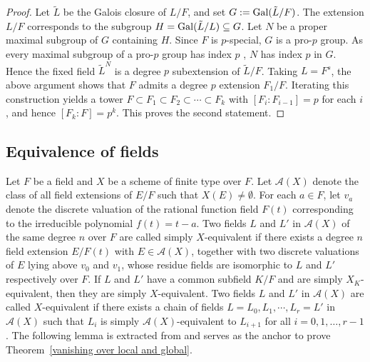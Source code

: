 \documentclass[10pt]{amsart}
\theoremstyle{plain}
\theoremstyle{definition}
\newcommand{\Gal}{{\rm Gal}}
\begin{document}
\begin{proof}
Let \(\tilde{L}\) be the Galois closure of \(L/F\), and set
\(G:=\Gal(\tilde{L}/F)\). The extension \(L/F\) corresponds to the subgroup \(H=\Gal(\tilde{L}/L)\subseteq G\). Let \(N\) be a proper maximal subgroup of \(G\) containing \(H\). Since \(F\) is \(p\)-special, \(G\) is a pro-\(p\) group. As every maximal subgroup of a pro-\(p\) group has index \(p\) \cite[Lemma 22.7.4]{fried2008field}, \(N\) has index \(p\) in \(G\). Hence the fixed field \(\tilde{L}^{N}\) is a degree \(p\) subextension of \(\tilde{L}/F\). Taking \(L=F^s\), the above argument shows that \(F\) admits a degree \(p\) extension \(F_1/F\). Iterating this construction yields a tower \(F \subset F_1 \subset F_2 \subset \cdots \subset F_k\) with \([F_i:F_{i-1}]=p\) for each \(i\), and hence \([F_k:F]=p^k\). This proves the second statement.
\end{proof}


\subsection{Equivalence of fields \cite[Section 6]{MC}}
Let \(F\) be a field and \(X\) be a scheme of finite type over \(F\). Let \(\mathcal{A}(X)\) denote the class of all field extensions of \(E/F\) such that \(X(E)\neq\emptyset\). For each \(a \in F\), let \(v_a\) denote the discrete valuation of the rational function field \(F(t)\) corresponding to the irreducible polynomial \(f(t)=t-a\). Two fields \(L\) and \(L'\) in \(\mathcal{A}(X)\) of the same degree \(n\) over \(F\) are called simply \(X\)-equivalent if there exists a degree \(n\) field extension \(E/F(t)\) with \(E \in \mathcal{A}(X)\), together with two discrete valuations of \(E\) lying above \(v_0\) and \(v_1\), whose residue fields are isomorphic to \(L\) and \(L'\) respectively over \(F\). If \(L\) and \(L'\) have a common subfield \(K/F\) and are simply \(X_K\)-equivalent, then they are simply \(X\)-equivalent.
Two fields \(L\) and \(L'\) in \(\mathcal{A}(X)\) are called \(X\)-equivalent if there exists a chain of fields \(L=L_0,L_1,\cdots,L_r = L'\) in \(\mathcal{A}(X)\) such that \(L_i\) is simply \(\mathcal{A}(X)\)-equivalent to \(L_{i+1}\) for all \(i = 0,1,\ldots,r-1\). The following lemma is extracted from \cite{MC} and serves as the anchor to prove Theorem~\ref{vanishing over local and global}.
\end{document}
